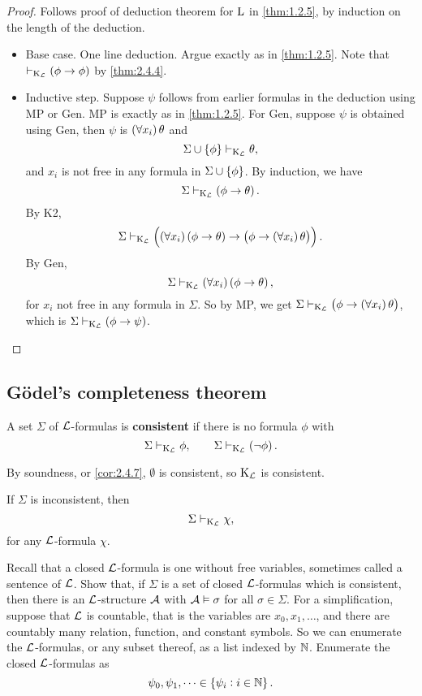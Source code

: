 \begin{proof}
Follows proof of deduction theorem for $ \mathrm{L} $ in \ref{thm:1.2.5}, by induction on the length of the deduction.
\begin{itemize}
\item Base case. One line deduction. Argue exactly as in \ref{thm:1.2.5}. Note that $ \vdash_{\K_\LLL} \impb{\phi}{\phi} $ by \ref{thm:2.4.4}.
\item Inductive step. Suppose $ \psi $ follows from earlier formulas in the deduction using MP or Gen. MP is exactly as in \ref{thm:1.2.5}. For Gen, suppose $ \psi $ is obtained using Gen, then $ \psi $ is $ \fab{x_i}\theta $ and
$$ \Sigma \cup \cbr{\phi} \vdash_{\K_\LLL} \theta, $$
and $ x_i $ is not free in any formula in $ \Sigma \cup \cbr{\phi} $. By induction, we have
$$ \Sigma \vdash_{\K_\LLL} \impb{\phi}{\theta}. $$
By K2,
$$ \Sigma \vdash_{\K_\LLL} \impb{\fab{x_i}\impb{\phi}{\theta}}{\impb{\phi}{\fab{x_i}\theta}}. $$
By Gen,
$$ \Sigma \vdash_{\K_\LLL} \fab{x_i}\impb{\phi}{\theta}, $$
for $ x_i $ not free in any formula in $ \Sigma $. So by MP, we get $ \Sigma \vdash_{\K_\LLL} \impb{\phi}{\fab{x_i}\theta} $, which is $ \Sigma \vdash_{\K_\LLL} \impb{\phi}{\psi} $.
\end{itemize}
\end{proof}

\pagebreak

\subsection{G\"odel's completeness theorem}


\begin{definition}
A set $ \Sigma $ of $ \mathcal{L} $-formulas is \textbf{consistent} if there is no formula $ \phi $ with
$$ \Sigma \vdash_{\K_\LLL} \phi, \qquad \Sigma \vdash_{\K_\LLL} \notb{\phi}. $$
\end{definition}

By soundness, or \ref{cor:2.4.7}, $ \emptyset $ is consistent, so $ \mathrm{K}_{\mathcal{L}} $ is consistent.

\begin{remark*}
If $ \Sigma $ is inconsistent, then
$$ \Sigma \vdash_{\mathrm{K}_{\mathcal{L}}} \chi, $$
for any $ \mathcal{L} $-formula $ \chi $.
\end{remark*}

Recall that a closed $ \mathcal{L} $-formula is one without free variables, sometimes called a sentence of $ \mathcal{L} $. Show that, if $ \Sigma $ is a set of closed $ \mathcal{L} $-formulas which is consistent, then there is an $ \mathcal{L} $-structure $ \mathcal{A} $ with $ \mathcal{A} \vDash \sigma $ for all $ \sigma \in \Sigma $. For a simplification, suppose that $ \mathcal{L} $ is countable, that is the variables are $ x_0, x_1, \dots $, and there are countably many relation, function, and constant symbols. So we can enumerate the $ \mathcal{L} $-formulas, or any subset thereof, as a list indexed by $ \mathbb{N} $. Enumerate the closed $ \mathcal{L} $-formulas as
$$ \psi_0, \psi_1, \dots \in \cbr{\psi_i : i \in \NN}. $$

